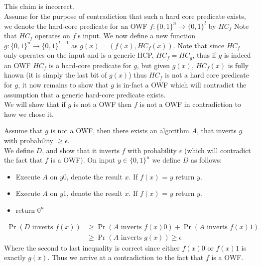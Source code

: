 \documentclass{article}
\begin{document}
\subsection{}
This claim is incorrect.\\
Assume for the purpose of contradiction that such a hard core predicate exists, we denote the hard-core predicate for an OWF $f:\{0,1\}^n \rightarrow \{0,1\}^l$ by $HC_f$
Note that $HC_f$ operates on $f$'s input.
We now define a new function $g:\{0,1\}^n \rightarrow \{0,1\}^{l+1}$ as $g(x) = (f(x), HC_f(x))$.
Note that since $HC_f$ only operates on the input and is a generic HCP, $HC_f = HC_g$, thus if $g$ is indeed an OWF $HC_f$ is a hard-core predicate for $g$, but given $g(x)$, $HC_f(x)$ is fully known (it is simply the last bit of $g(x)$) thus $HC_f$ is not a hard core predicate for $g$, it now remains to show that $g$ is in-fact a OWF which will contradict the assumption that a generic hard-core predicate exists.\\
We will show that if $g$ is not a OWF then $f$ is not a OWF in contradiction to how we chose it.

Assume that $g$ is not a OWF, then there exists an algorithm $A$, that inverts $g$ with probability $\geq \epsilon$.\\
We define $D$, and show that it inverts $f$ with probability $\epsilon$ (which will contradict the fact that $f$ is a OWF).
On input $y \in \{0,1\}^n$ we define $D$ as follows:
\begin{itemize}
\item Execute $A$ on $y0$, denote the result $x$. If $f(x)$ = $y$ return $y$.
\item Execute $A$ on $y1$, denote the result $x$. If $f(x)$ = $y$ return $y$.
\item return $0^n$
\end{itemize}

\begin{align*}
\Pr(D \mbox{ inverts } f(x)) &\geq \Pr(A \mbox{ inverts } f(x)0 ) + \Pr(A \mbox{ inverts } f(x)1 )\\ 
&\geq \Pr(A \mbox{ inverts } g(x) ) \geq \epsilon
\end{align*}
Where the second to last inequality is correct since either $f(x)0$ or $f(x)1$ is exactly $g(x)$.
Thus we arrive at a contradiction to the fact that $f$ is a OWF.
\end{document}
